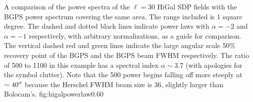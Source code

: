 {A comparison of the power spectra of the $\ell=30$ HiGal SDP fields with the
BGPS power spectrum covering the same area.  The range included is 1 square
degree.  The dashed and dotted black lines indicate power laws with $\alpha=-2$
and $\alpha=-1$ respectively, with arbitrary normalizations, as a guide for
comparison.  The vertical dashed red and green lines indicate the large angular
scale 50\% recovery point of the BGPS and the BGPS beam FWHM respectively.
The ratio of 500 \um to 1100 \um in this example has a spectral index
$\alpha\sim3.7$ (with apologies for the symbol clutter).  Note that the 500 \um
power begins falling off more steeply at $\sim40\mbox{$^{\prime\prime}$}$ because the Herschel
FWHM beam size is 36\arcsec, slightly larger than Bolocam's.}
{fig:higalpowerlaw}{0.6}{0}


% 


